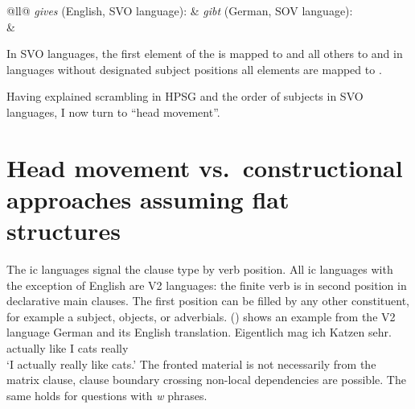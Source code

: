 \documentclass[output=paper
                ,modfonts
                ,nonflat
	        ,collection
	        ,collectionchapter
	        ,collectiontoclongg
 	        ,biblatex
                ,babelshorthands
                ,newtxmath
                ,draftmode
                ,colorlinks, citecolor=brown
]{./langsci/langscibook}
\begin{document}
\ea
\begin{tabular}[t]{@{}ll@{}}
\emph{gives} (English, SVO language): & \emph{gibt} (German, SOV language):\\
& 
\end{tabular}
\z
In SVO languages, the first element of the \argstl is mapped to \spr and all others to \comps and in
languages without designated subject positions all \argst elements are mapped to \comps.

Having explained scrambling in HPSG and the order of subjects in SVO languages, I now turn to ``head movement''.



\section{Head movement vs.\ constructional approaches assuming flat structures}
\label{sec-head-movement-vs-flat}


The ic languages signal the clause type by verb position. All ic languages with the
exception of English are V2 languages: the finite verb is in second position in declarative main
clauses. The first position can be filled by any other constituent, for example a subject,
objects, or adverbials. () shows an example from the V2 language German and its English translation.
\ea 
\gll Eigentlich mag ich Katzen sehr.\\
     actually   like I cats really\\
\glt `I actually really like cats.'
\z
The fronted material is not necessarily from the matrix clause, clause boundary
crossing non-local dependencies are possible. The same holds for questions with \emph{w} phrases. 
\end{document}
